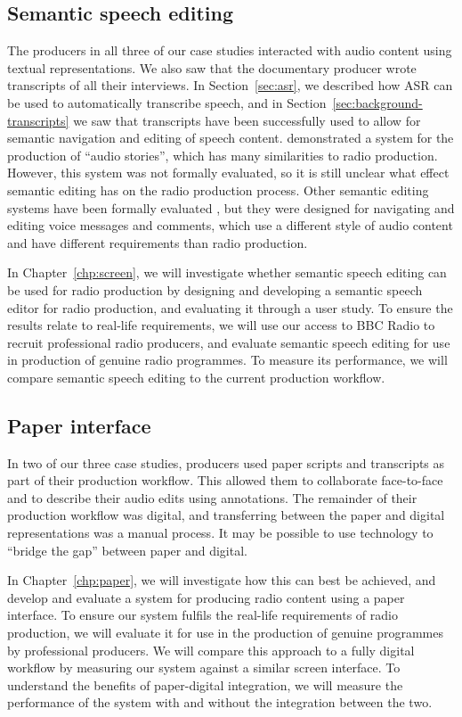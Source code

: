 \subsection{Semantic speech editing}

The producers in all three of our case studies interacted with audio content using textual representations. We also saw
that the documentary producer wrote transcripts of all their interviews.  In Section~\ref{sec:asr}, we described how
ASR can be used to automatically transcribe speech, and in Section~\ref{sec:background-transcripts} we saw that
transcripts have been successfully used to allow for semantic navigation and editing of speech content.
\citet{Rubin2013} demonstrated a system for the production of ``audio stories'', which has many similarities to radio
production.  However, this system was not formally evaluated, so it is still unclear what effect semantic editing has
on the radio production process. Other semantic editing systems have been formally evaluated
\citep{Whittaker2004,Yoon2014,Sivaraman2016}, but they were designed for navigating and editing voice messages and
comments, which use a different style of audio content and have different requirements than radio production.

In Chapter~\ref{chp:screen}, we will investigate whether semantic speech editing can be used for radio production by
designing and developing a semantic speech editor for radio production, and evaluating it through a user study.
To ensure the results relate to real-life requirements, we will use our access to BBC Radio to recruit professional
radio producers, and evaluate semantic speech editing for use in production of genuine radio programmes.
To measure its performance, we will compare semantic speech editing to the current production workflow.

\subsection{Paper interface}

In two of our three case studies, producers used paper scripts and transcripts as part of their production workflow.
This allowed them to collaborate face-to-face and to describe their audio edits using annotations. The remainder of
their production workflow was digital, and transferring between the paper and digital representations was a manual
process. It may be possible to use technology to ``bridge the gap'' between paper and digital.

In Chapter~\ref{chp:paper}, we will investigate how this can best be achieved, and develop and evaluate a system for
producing radio content using a paper interface.  To ensure our system fulfils the real-life requirements of radio
production, we will evaluate it for use in the production of genuine programmes by professional producers.  We will
compare this approach to a fully digital workflow by measuring our system against a similar screen interface. To
understand the benefits of paper-digital integration, we will measure the performance of the system with and without
the integration between the two.
